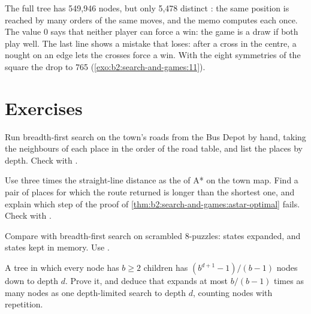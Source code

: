 \label{out:b2:search-and-games:tictactoe}

The full tree has 549,946 nodes, but only 5,478 distinct : the same position is reached by many orders of the
same moves, and the memo computes each once. The value $0$ says that neither player can force a win: the game is a draw
if both play well. The last line shows a mistake that loses: after a cross in the centre, a nought on an edge lets the
crosses force a win. With the eight symmetries of the square the  drop to 765
(\cref{exo:b2:search-and-games:11}).

\section{Exercises}\label{sec:b2:search-and-games:exercises}

\begin{exercise}[$\star$]\label{exo:b2:search-and-games:1}
Run breadth-first search on the town's roads from the Bus Depot by hand, taking the neighbours of each place in the order
of the road table, and list the places by depth. Check with .
\end{exercise}

\begin{exercise}[$\star$]\label{exo:b2:search-and-games:2}
Use three times the straight-line distance as the  of A* on the town map. Find a pair of places for which the
route returned is longer than the shortest one, and explain which step of the proof of
\cref{thm:b2:search-and-games:astar-optimal} fails. Check with .
\end{exercise}

\begin{exercise}[$\star$]\label{exo:b2:search-and-games:3}
Compare  with breadth-first search on scrambled 8-puzzles: states expanded, and states kept in memory.
Use .
\end{exercise}

\begin{exercise}[$\star$]\label{exo:b2:search-and-games:4}
A tree in which every node has $b \geq 2$ children has $(b^{d+1} - 1)/(b - 1)$ nodes down to depth $d$. Prove it, and
deduce that  expands at most $b/(b - 1)$ times as many nodes as one depth-limited search to depth $d$,
counting nodes with repetition.
\end{exercise}

